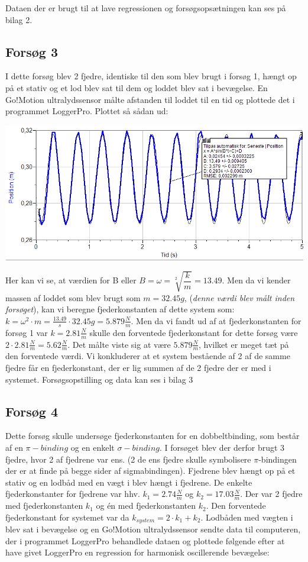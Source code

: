 Dataen der er brugt til at lave regressionen og forsøgsopsætningen kan ses på bilag 2.
\subsection{Forsøg 3}
I dette forsøg blev 2 fjedre, identiske til den som blev brugt i forsøg 1, hængt op på et stativ og et lod blev sat til dem og loddet blev sat i bevægelse. En Go!Motion ultralydssensor målte afstanden til loddet til en tid og plottede det i programmet LoggerPro. Plottet så sådan ud:

\begin{center}
\includegraphics[scale=0.7]{Billeder/graf3}
\end{center}

Her kan vi se, at værdien for B eller $B = \omega = \sqrt[2]{\dfrac{k}{m}}=13.49$. Men da vi kender massen af loddet som blev brugt som $m=32.45g$, (\emph{denne værdi blev målt inden forsøget}), kan vi beregne fjederkonstanten af dette system som:
$k=\omega^2 \cdot m = \frac{13.49}{s} \cdot 32.45g = 5.879 \frac{N}{m}$. Men da vi fandt ud af at fjederkonstanten for forsøg 1 var $k=2.81\frac{N}{m}$ skulle den forventede fjederkonstant for dette forsøg være $2 \cdot 2.81 \frac{N}{m}= 5.62 \frac{N}{m}$. Det målte viste sig at være $5.879 \frac{N}{m}$, hvilket er meget tæt på den forventede værdi. Vi konkluderer at et system bestående af 2 af de samme fjedre får en fjederkonstant, der er lig summen af de 2 fjedre der er med i systemet. Forsøgsopstilling og data kan ses i bilag 3

\subsection{Forsøg 4}
Dette forsøg skulle undersøge fjederkonstanten for en dobbeltbinding, som består af en $\pi-binding$ og en enkelt $\sigma-binding$. I forsøget blev der derfor brugt 3 fjedre, hvor 2 af fjedrene var ens. (2 de ens fjedre skulle symbolisere $\pi$-bindingen der er at finde på begge sider af sigmabindingen). Fjedrene blev hængt op på et stativ og en lodbåd med en vægt i blev hængt i fjedrene. De enkelte fjederkonstanter for fjedrene var hhv. $k_1 = 2.74\frac{N}{m}$ og $k_2=17.03 \frac{N}{m}$. Der var 2 fjedre med fjederkonstanten $k_1$ og én med fjederkonstanten $k_2$. Den forventede fjederkonstant for systemet var da $k_{system}= 2 \cdot k_1 + k_2$. Lodbåden med vægten i blev sat i bevægelse og en Go!Motion ultralydssensor sendte data til computeren, der i programmet LoggerPro behandlede dataen og plottede følgende efter at have givet LoggerPro en regression for harmonisk oscillerende bevægelse:

